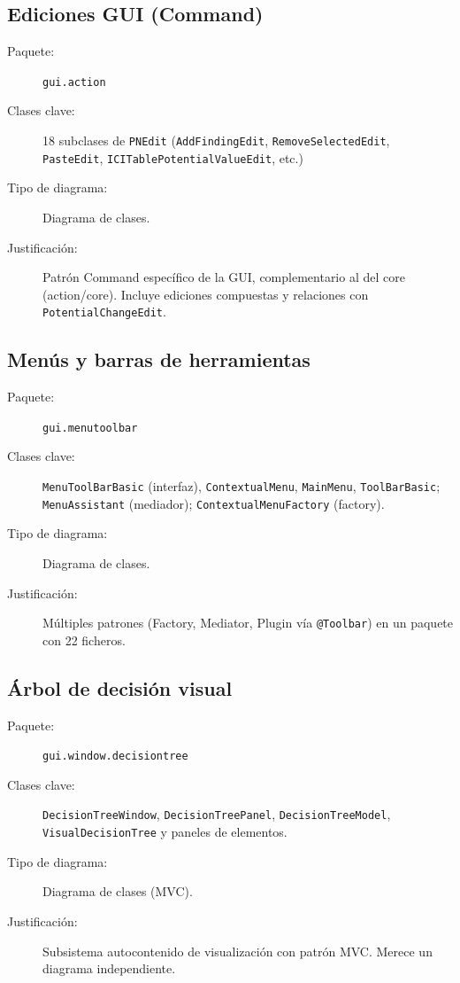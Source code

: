 \documentclass[11pt,a4paper]{article}
\newcommand{\code}[1]{\texttt{#1}}
\newcommand{\pkg}[1]{\texttt{\small #1}}
\begin{document}
\subsection{Ediciones GUI (Command)}

\begin{description}
  \item[Paquete:] \pkg{gui.action}
  \item[Clases clave:] 18 subclases de \code{PNEdit}
        (\code{AddFindingEdit}, \code{RemoveSelectedEdit},
        \code{PasteEdit}, \code{ICITablePotentialValueEdit}, etc.)
  \item[Tipo de diagrama:] Diagrama de clases.
  \item[Justificaci\'on:] Patr\'on Command espec\'ifico de la GUI,
        complementario al del core (action/core).  Incluye ediciones
        compuestas y relaciones con \code{PotentialChangeEdit}.
\end{description}

\subsection{Men\'us y barras de herramientas}

\begin{description}
  \item[Paquete:] \pkg{gui.menutoolbar}
  \item[Clases clave:] \code{MenuToolBarBasic} (interfaz),
        \code{ContextualMenu}, \code{MainMenu}, \code{ToolBarBasic};
        \code{MenuAssistant} (mediador);
        \code{ContextualMenuFactory} (factory).
  \item[Tipo de diagrama:] Diagrama de clases.
  \item[Justificaci\'on:] M\'ultiples patrones (Factory, Mediator,
        Plugin v\'ia \code{@Toolbar}) en un paquete con 22 ficheros.
\end{description}

\subsection{\'Arbol de decisi\'on visual}

\begin{description}
  \item[Paquete:] \pkg{gui.window.decisiontree}
  \item[Clases clave:] \code{DecisionTreeWindow},
        \code{DecisionTreePanel}, \code{DecisionTreeModel},
        \code{VisualDecisionTree} y paneles de elementos.
  \item[Tipo de diagrama:] Diagrama de clases (MVC).
  \item[Justificaci\'on:] Subsistema autocontenido de visualizaci\'on
        con patr\'on MVC.  Merece un diagrama independiente.
\end{description}
\end{document}
